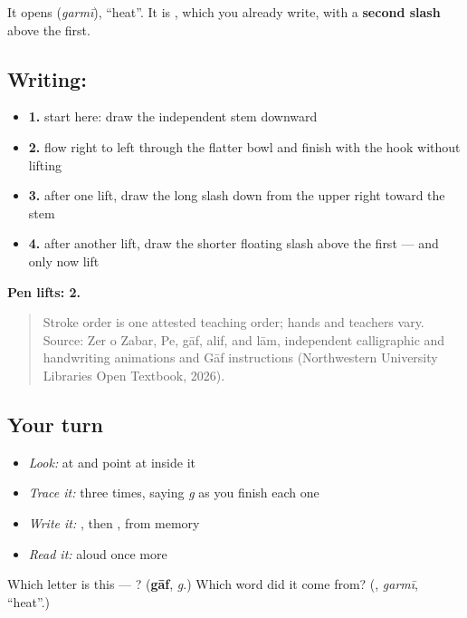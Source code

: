 It opens \textbf{} (\emph{garmī}), \textquotedblleft{}heat\textquotedblright{}. It is \textbf{}, which you already write, with a \textbf{second slash} above the first.

\subsection*{Writing: }

\begin{itemize}
\raggedright
  \item \textbf{1.} start here: draw the independent stem downward
  \item \textbf{2.} flow right to left through the flatter bowl and finish with the hook without lifting
  \item \textbf{3.} after one lift, draw the long slash down from the upper right toward the stem
  \item \textbf{4.} after another lift, draw the shorter floating slash above the first — and only now lift
\end{itemize}

\textbf{Pen lifts: 2.}

\begin{quote}
Stroke order is one attested teaching order; hands and teachers vary. Source: Zer o Zabar, Pe, gāf, alif, and lām, independent  calligraphic and handwriting animations and Gāf instructions (Northwestern University Libraries Open Textbook, 2026).
\end{quote}

\subsection*{Your turn}
\begin{itemize}
\raggedright
  \item \emph{Look:} at \textbf{} and point at  inside it
  \item \emph{Trace it:}  three times, saying \emph{g} as you finish each one
  \item \emph{Write it:} , then , from memory
  \item \emph{Read it:} \textbf{} aloud once more
\end{itemize}

\begin{tcolorbox}[breakable,colback=teal!4,colframe=teal!35!black,title={Before you move on}]
Which letter is this — ? (\textbf{gāf}, \emph{g}.) Which word did it come from? (\textbf{}, \emph{garmī}, \textquotedblleft{}heat\textquotedblright{}.)
\end{tcolorbox}
